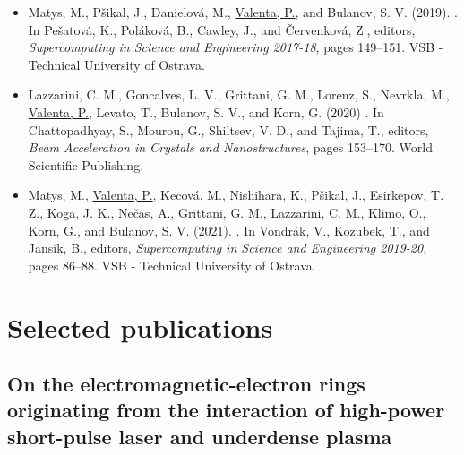 \documentclass[10pt, a4paper, twoside, openright]{report}
\newcommand{\link}[3][blue]{\href{#2}{\color{#1}{#3}}}%
\begin{document}
\begin{itemize}
	
	\renewcommand{\labelitemi}{\tiny$\blacksquare$}
	
	\item Matys, M., Pšikal, J., Danielová, M., \underline{Valenta, P.}, and Bulanov, S. V. (2019). \link{https://www.it4i.cz/cs/file/abd1875ff7d0e6f59799c4f470545516/173/Supercomputing-in-Science-and-Engineering_preview.pdf}{Laser-driven ion acceleration using cryogenic hydrogen targets}. In Pešatová, K., Poláková, B., Cawley, J., and Červenková, Z., editors, \textit{Supercomputing in Science and Engineering 2017-18}, pages 149--151. VSB - Technical University of Ostrava.
	
	\item Lazzarini, C. M., Goncalves, L. V., Grittani, G. M., Lorenz, S., Nevrkla, M., \underline{Valenta, P.}, Levato, T., Bulanov, S. V., and Korn, G. (2020) \link{https://doi.org/10.1142/9789811217135_0010}{Electron acceleration at ELI Beamlines: towards high-energy and high-repetition-rate accelerators}. In Chattopadhyay, S., Mourou, G., Shiltsev, V. D., and Tajima, T., editors, \textit{Beam Acceleration in Crystals and Nanostructures}, pages 153--170. World Scientific Publishing.
	
	\item Matys, M., \underline{Valenta, P.}, Kecová, M., Nishihara, K., Pšikal, J., Esirkepov, T. Z., Koga, J. K., Nečas, A., Grittani, G. M., Lazzarini, C. M., Klimo, O., Korn, G., and Bulanov, S. V. (2021). \link{https://www.it4i.cz/file/be151db89e56452e36511f5410126441/6419/Supercomputing\%20in\%20Science\%20and\%20Engineering\%202019-2020.pdf}{Laser-driven acceleration of charged particles}. In Vondrák, V., Kozubek, T., and Jansík, B., editors, \textit{Supercomputing in Science and Engineering 2019-20}, pages 86--88. VSB - Technical University of Ostrava.
	
\end{itemize}

\chapter{Selected publications\label{chap:selected_publications}}
%

\newpage
\thispagestyle{empty}
\mbox{}

\newpage
\section{On the electromagnetic-electron rings originating from the interaction of high-power short-pulse laser and underdense plasma\label{sec:paper_1}}
\end{document}
